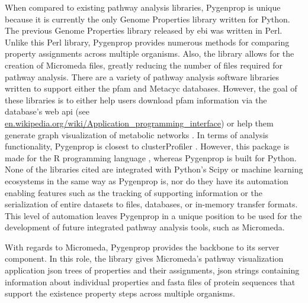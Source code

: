 When compared to existing pathway analysis libraries, Pygenprop is unique 
because it is currently the only Genome Properties library written for Python. 
The previous Genome Properties library released by \gls{ebi} was written in 
Perl. Unlike this Perl library, Pygenprop provides numerous methods for 
comparing property assignments across multiple organisms. Also, the library 
allows for the creation of Micromeda files, greatly reducing the number of files 
required for pathway analysis. There are a variety of pathway analysis software 
libraries written to support either the \gls{pfam} 
\cite{zhang2009kegggraph,posma2013metabonetworks,yu2012clusterprofiler,cock2009biopython} 
and Metacyc \cite{international} databases. However, the goal of these libraries 
is to either help users download \gls{pfam} information via the database's web 
\gls{api} \cite{cock2009biopython} (see 
\href{http://en.wikipedia.org/wiki/Application_programming_interface}{en.wikipedia.org/wiki/Application\_programming\_interface}) 
or help them generate graph visualization of metabolic networks 
\cite{posma2013metabonetworks}. In terms of analysis functionality, Pygenprop is 
closest to clusterProfiler \cite{yu2012clusterprofiler}. However, this package 
is made for the R programming language \cite{rprogman}, whereas Pygenprop is 
built for Python. None of the libraries cited are integrated with Python's Scipy 
\cite{scipystack} or machine learning ecosystems in the same way as Pygenprop 
is, nor do they have its automation enabling features such as the tracking of 
supporting information or the serialization of entire datasets to files, 
databases, or in-memory transfer formats. This level of automation leaves 
Pygenprop in a unique position to be used for the development of future 
integrated pathway analysis tools, such as Micromeda.

With regards to Micromeda, Pygenprop provides the backbone to its server 
component. In this role, the library gives Micromeda's pathway visualization application 
\gls{json} trees of properties and their assignments, \gls{json} strings 
containing information about individual properties and \gls{fasta} files of protein 
sequences that support the existence property steps across multiple organisms.

